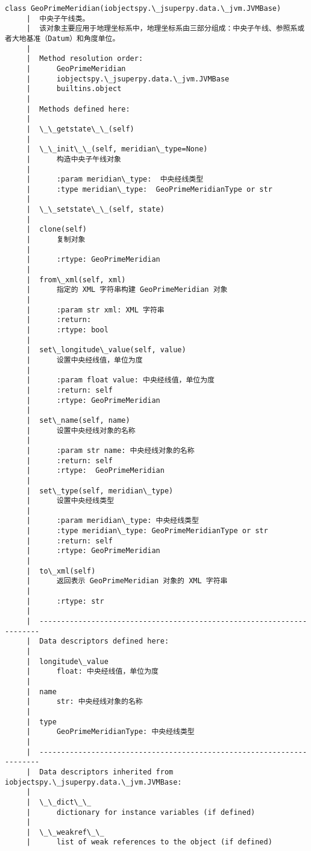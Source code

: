 \documentclass[11pt]{article}
\begin{document}
\begin{Verbatim}[commandchars=\\\{\}]
    class GeoPrimeMeridian(iobjectspy.\_jsuperpy.data.\_jvm.JVMBase)
     |  中央子午线类。
     |  该对象主要应用于地理坐标系中，地理坐标系由三部分组成：中央子午线、参照系或者大地基准（Datum）和角度单位。
     |  
     |  Method resolution order:
     |      GeoPrimeMeridian
     |      iobjectspy.\_jsuperpy.data.\_jvm.JVMBase
     |      builtins.object
     |  
     |  Methods defined here:
     |  
     |  \_\_getstate\_\_(self)
     |  
     |  \_\_init\_\_(self, meridian\_type=None)
     |      构造中央子午线对象
     |      
     |      :param meridian\_type:  中央经线类型
     |      :type meridian\_type:  GeoPrimeMeridianType or str
     |  
     |  \_\_setstate\_\_(self, state)
     |  
     |  clone(self)
     |      复制对象
     |      
     |      :rtype: GeoPrimeMeridian
     |  
     |  from\_xml(self, xml)
     |      指定的 XML 字符串构建 GeoPrimeMeridian 对象
     |      
     |      :param str xml: XML 字符串
     |      :return:
     |      :rtype: bool
     |  
     |  set\_longitude\_value(self, value)
     |      设置中央经线值，单位为度
     |      
     |      :param float value: 中央经线值，单位为度
     |      :return: self
     |      :rtype: GeoPrimeMeridian
     |  
     |  set\_name(self, name)
     |      设置中央经线对象的名称
     |      
     |      :param str name: 中央经线对象的名称
     |      :return: self
     |      :rtype:  GeoPrimeMeridian
     |  
     |  set\_type(self, meridian\_type)
     |      设置中央经线类型
     |      
     |      :param meridian\_type: 中央经线类型
     |      :type meridian\_type: GeoPrimeMeridianType or str
     |      :return: self
     |      :rtype: GeoPrimeMeridian
     |  
     |  to\_xml(self)
     |      返回表示 GeoPrimeMeridian 对象的 XML 字符串
     |      
     |      :rtype: str
     |  
     |  ----------------------------------------------------------------------
     |  Data descriptors defined here:
     |  
     |  longitude\_value
     |      float: 中央经线值，单位为度
     |  
     |  name
     |      str: 中央经线对象的名称
     |  
     |  type
     |      GeoPrimeMeridianType: 中央经线类型
     |  
     |  ----------------------------------------------------------------------
     |  Data descriptors inherited from iobjectspy.\_jsuperpy.data.\_jvm.JVMBase:
     |  
     |  \_\_dict\_\_
     |      dictionary for instance variables (if defined)
     |  
     |  \_\_weakref\_\_
     |      list of weak references to the object (if defined)
    

\end{Verbatim}
\end{document}

